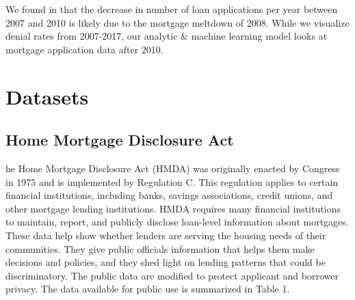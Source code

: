 \documentclass[conference,compsoc]{IEEEtran}
\begin{document}
We found in \cite{CRA} that the decrease in number of loan applications per year between 2007 and 2010 is likely due to the mortgage meltdown of 2008.  While we visualize denial rates from 2007-2017, our analytic \& machine learning model looks at mortgage application data after 2010.  

\section{Datasets}


\subsection{Home Mortgage Disclosure Act}
he Home Mortgage Disclosure Act (HMDA) was originally enacted by Congress in 1975 and is implemented by Regulation C. This regulation applies to certain financial institutions, including banks, savings associations, credit unions, and other mortgage lending institutions.  HMDA requires many financial institutions to maintain, report, and publicly disclose loan-level information about mortgages. These data help show whether lenders are serving the housing needs of their communities. They give public officials information that helps them make decisions and policies, and they shed light on lending patterns that could be discriminatory. The public data are modified to protect applicant and borrower privacy. The data available for public use is summarized in Table 1.
\end{document}
